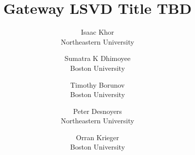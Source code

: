 \documentclass[letterpaper,twocolumn,10pt]{article}
\begin{document}
\date{}

\title{\Large \bf
	Gateway LSVD Title TBD\\}

\author{
	{\rm Isaac Khor}\\
	Northeastern University
	\and
	{\rm Sumatra K Dhimoyee}\\
	Boston University
	\and
	{\rm Timothy Borunov}\\
	Boston University
	\and
	{\rm Peter Desnoyers}\\
	Northeastern University
	\and
	{\rm Orran Krieger}\\
	Boston University
}

\maketitle















\end{document}
